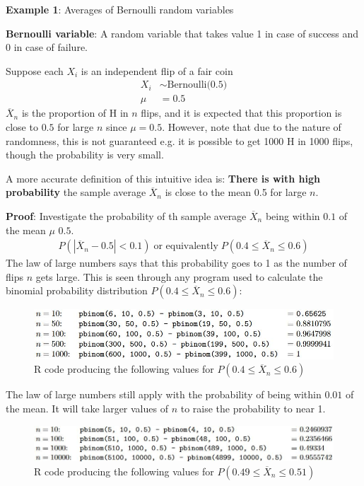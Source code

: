 \documentclass[10pt,a4paper]{article}
\begin{document}
\textbf{Example 1}: Averages of Bernoulli random variables

\textbf{Bernoulli variable}: A random variable that takes value 1 in case of success and 0 in case of failure.

Suppose each $X_i$ is an independent flip of a fair coin
\begin{align*}
	X_i &\sim \text{Bernoulli(0.5)} \\
	\mu &= 0.5
\end{align*}
$\overline{X}_n$ is the proportion of H in $n$ flips, and it is expected that this proportion is
close to $0.5$ for large $n$ since $\mu = 0.5$. However, note that due to the nature of randomness,
this is not guaranteed e.g. it is possible to get 1000 H in 1000 flips, though the probability is
very small. 

A more accurate definition of this intuitive idea is: \textbf{There is with high
probability} the sample average $\overline{X}_n$ is close to the mean 0.5 for large $n$.

\textbf{Proof}: Investigate the probability of th sample average $\overline{X}_n$ being within $0.1$
of the mean $\mu$ $0.5$.
\begin{align*}
	P(|\overline{X}_n - 0.5|<0.1) \; \text{or equivalently} \; P(0.4 \leq \overline{X}_n \leq 0.6)
\end{align*}
The law of large numbers says that this probability goes to 1 as the number of flips $n$ gets large.
This is seen through any program used to calculate the binomial probability distribution $P(0.4 \leq
\overline{X}_n \leq 0.6)$:
\begin{figure} [h!]
	\centering
	\includegraphics[scale=0.62]{pbino.JPG}
	\caption{R code producing the following values for $P(0.4 \leq\overline{X}_n \leq 0.6)$}
\end{figure}

The law of large numbers still apply with the probability of being within $0.01$ of the mean. It
will take larger values of $n$ to raise the probability to near 1. 
\begin{figure} [h!]
	\centering
	\includegraphics[scale=0.62]{pbino2.JPG}
	\caption{R code producing the following values for $P(0.49 \leq\overline{X}_n \leq 0.51)$}
\end{figure}
\end{document}
